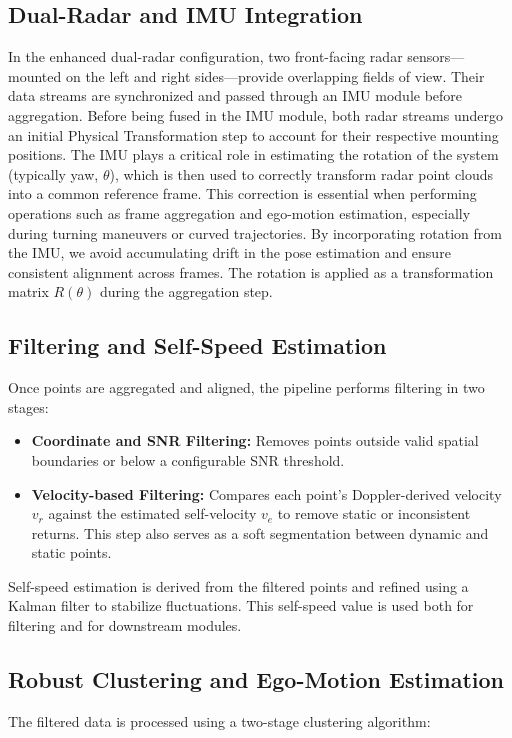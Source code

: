 \subsection*{Dual-Radar and IMU Integration}
In the enhanced dual-radar configuration, two front-facing radar sensors—mounted on the left and right sides—provide overlapping fields of view. 
Their data streams are synchronized and passed through an IMU module before aggregation.
Before being fused in the IMU module, both radar streams undergo an initial Physical Transformation step to account for their respective mounting positions.
The IMU plays a critical role in estimating the rotation of the system (typically yaw, $\theta$), which is then used to correctly transform radar point clouds into a common reference frame. 
This correction is essential when performing operations such as frame aggregation and ego-motion estimation, especially during turning maneuvers or curved trajectories.
By incorporating rotation from the IMU, we avoid accumulating drift in the pose estimation and ensure consistent alignment across frames. 
The rotation is applied as a transformation matrix $R(\theta)$ during the aggregation step.

\subsection*{Filtering and Self-Speed Estimation}
Once points are aggregated and aligned, the pipeline performs filtering in two stages:

\begin{itemize}
    \item \textbf{Coordinate and SNR Filtering:} Removes points outside valid spatial boundaries or below a configurable SNR threshold.
    \item \textbf{Velocity-based Filtering:} Compares each point's Doppler-derived velocity $v_r$ against the estimated self-velocity $v_e$ to remove static or inconsistent returns. This step also serves as a soft segmentation between dynamic and static points.
\end{itemize}

Self-speed estimation is derived from the filtered points and refined using a Kalman filter to stabilize fluctuations. This self-speed value is used both for filtering and for downstream modules.

\subsection*{Robust Clustering and Ego-Motion Estimation}
The filtered data is processed using a two-stage clustering algorithm:

